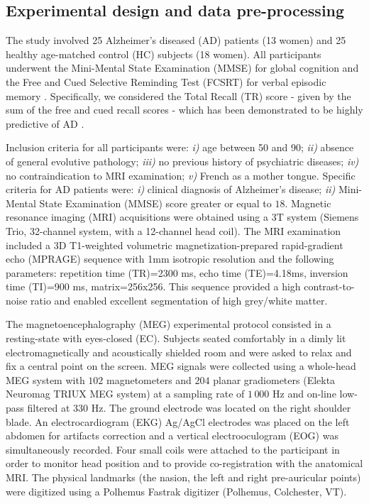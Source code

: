 
\subsection{Experimental design and data pre-processing}

The study involved 25 Alzheimer's diseased (AD) patients (13 women) and 25 healthy age-matched control (HC) subjects (18 women).
All participants underwent the Mini-Mental State Examination (MMSE) for global cognition \cite{folstein_mini-mental_1975} and the Free and Cued Selective Reminding Test (FCSRT) for verbal episodic memory \citep{buschke_cued_1984, grober_screening_1988, pillon_explicit_1993}. Specifically, we considered the Total Recall (TR) score - given by the sum of the free and cued recall scores - which has been demonstrated to be highly predictive of AD \citep{sarazin_amnestic_2007}.

Inclusion criteria for all participants were: \textit{i)} age between 50 and 90; \textit{ii)} absence of general evolutive pathology; \textit{iii)} no previous history of psychiatric diseases; \textit{iv) }no contraindication to MRI examination; \textit{v)} French as a mother tongue.
Specific criteria for AD patients were: \textit{i)} clinical diagnosis of Alzheimer's disease;\textit{ ii)} Mini-Mental State Examination (MMSE) score greater or equal to $18$.
Magnetic resonance imaging (MRI) acquisitions were obtained using a 3T system (Siemens Trio, 32-channel system, with a 12-channel head coil). The MRI examination included a 3D T1-weighted volumetric magnetization-prepared rapid-gradient echo (MPRAGE) sequence with 1mm isotropic resolution and the following parameters: repetition time (TR)=2300 ms, echo time (TE)=4.18ms, inversion time (TI)=900 ms, matrix=256x256. This sequence provided a high contrast-to-noise ratio and enabled excellent segmentation of high grey/white matter.

The magnetoencephalography (MEG) experimental protocol consisted in a resting-state with eyes-closed (EC). Subjects seated comfortably in a dimly lit electromagnetically and acoustically shielded room and were asked to relax and fix a central point on the screen.
MEG signals were collected using a whole-head MEG system with $102$ magnetometers and $204$ planar gradiometers (Elekta Neuromag TRIUX MEG system) at a sampling rate of $1\,000$ Hz and on-line low-pass filtered at $330$ Hz.
The ground electrode was located on the right shoulder blade. An electrocardiogram (EKG) Ag/AgCl electrodes was placed on the left abdomen for artifacts correction and a vertical electrooculogram (EOG) was simultaneously recorded.
Four small coils were attached to the participant in order to monitor head position and to provide co-registration with the anatomical MRI. The physical landmarks (the nasion, the left and right pre-auricular points) were digitized using a Polhemus Fastrak digitizer (Polhemus, Colchester, VT).

